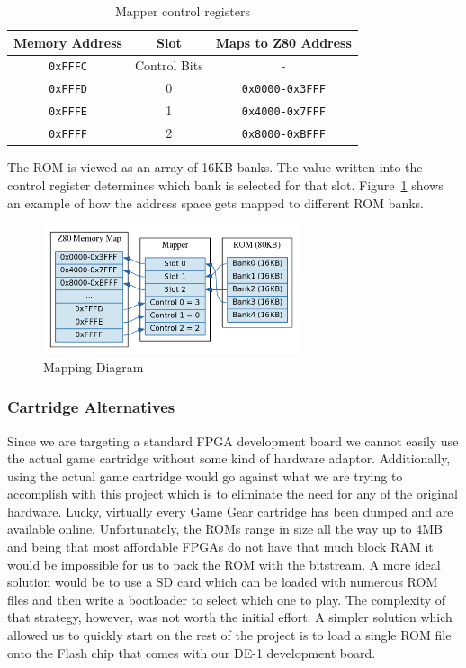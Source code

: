 \documentclass{article}
\begin{document}
\begin{table}[H]
    \centering
    \begin{tabular}{ccc}
        \toprule
        \textbf{Memory Address} & \textbf{Slot} & \textbf{Maps to Z80 Address} \\
        \midrule
        \texttt{0xFFFC} & Control Bits & - \\
        \texttt{0xFFFD} & 0            & \texttt{0x0000-0x3FFF} \\
        \texttt{0xFFFE} & 1            & \texttt{0x4000-0x7FFF} \\
        \texttt{0xFFFF} & 2            & \texttt{0x8000-0xBFFF} \\
        \bottomrule
    \end{tabular}
    \caption{Mapper control registers \protect\cite{mapper}}
\end{table}

The ROM is viewed as an array of 16KB banks. The value written into the control
register determines which bank is selected for that slot.
Figure~\ref{fig:mapping_diagram} shows an example of how the address space gets
mapped to different ROM banks.

\begin{figure}[H]
\centering
\includegraphics[height=1.5in]{../images/mapper.png}
\caption{Mapping Diagram}
\label{fig:mapping_diagram}
\end{figure}

\subsubsection{Cartridge Alternatives}
Since we are targeting a standard FPGA development board we cannot easily use
the actual game cartridge without some kind of hardware adaptor.  Additionally,
using the actual game cartridge would go against what we are trying to
accomplish with this project which is to eliminate the need for any of the
original hardware. Lucky, virtually every Game Gear cartridge has been dumped
and are available online.  Unfortunately, the ROMs range in size all the way up
to 4MB and being that most affordable FPGAs do not have that much block RAM it
would be impossible for us to pack the ROM with the bitstream. A more ideal
solution would be to use a SD card which can be loaded with numerous ROM files
and then write a bootloader to select which one to play.  The complexity of
that strategy, however, was not worth the initial effort. A simpler solution
which allowed us to quickly start on the rest of the project is to load a
single ROM file onto the Flash chip that comes with our DE-1 development board.
\end{document}
